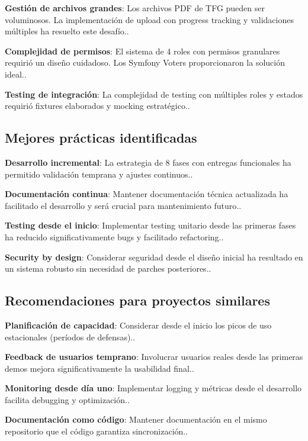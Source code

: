 \documentclass[12pt,a4paper,oneside]{report}
\begin{document}
\textbf{Gestión de archivos grandes}: Los archivos PDF de TFG pueden ser
voluminosos. La implementación de upload con progress tracking y
validaciones múltiples ha resuelto este desafío..

\textbf{Complejidad de permisos}: El sistema de 4 roles con permisos
granulares requirió un diseño cuidadoso. Los Symfony Voters
proporcionaron la solución ideal..

\textbf{Testing de integración}: La complejidad de testing con múltiples
roles y estados requirió fixtures elaborados y mocking estratégico..

\subsection{Mejores prácticas
identificadas}\label{mejores-pruxe1cticas-identificadas}

\textbf{Desarrollo incremental}: La estrategia de 8 fases con entregas
funcionales ha permitido validación temprana y ajustes continuos..

\textbf{Documentación continua}: Mantener documentación técnica
actualizada ha facilitado el desarrollo y será crucial para
mantenimiento futuro..

\textbf{Testing desde el inicio}: Implementar testing unitario desde las
primeras fases ha reducido significativamente bugs y facilitado
refactoring..

\textbf{Security by design}: Considerar seguridad desde el diseño
inicial ha resultado en un sistema robusto sin necesidad de parches
posteriores..

\subsection{Recomendaciones para proyectos
similares}\label{recomendaciones-para-proyectos-similares}

\textbf{Planificación de capacidad}: Considerar desde el inicio los
picos de uso estacionales (períodos de defensas)..

\textbf{Feedback de usuarios temprano}: Involucrar usuarios reales desde
las primeras demos mejora significativamente la usabilidad final..

\textbf{Monitoring desde día uno}: Implementar logging y métricas desde
el desarrollo facilita debugging y optimización..

\textbf{Documentación como código}: Mantener documentación en el mismo
repositorio que el código garantiza sincronización..
\end{document}
